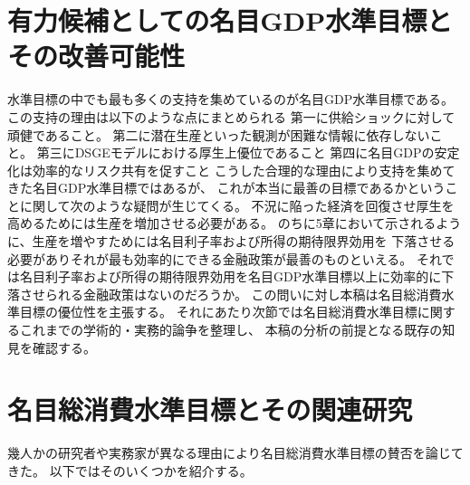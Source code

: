 \section{有力候補としての名目GDP水準目標とその改善可能性}
\label{sec:chapter2_review_merits_of_ngdplt}
水準目標の中でも最も多くの支持を集めているのが名目GDP水準目標である。
この支持の理由は以下のような点にまとめられる
第一に供給ショックに対して頑健であること\parencite{Sumner2014,BhandariFrankel2017}。
第二に潜在生産といった観測が困難な情報に依存しないこと\parencite{Orphanides2003,BeckworthHendrickson2019}。
第三にDSGEモデルにおける厚生上優位であること\parencite{GarinLesterSims2016}
第四に名目GDPの安定化は効率的なリスク共有を促すこと\parencite{Sheedy2014}
こうした合理的な理由により支持を集めてきた名目GDP水準目標ではあるが、
これが本当に最善の目標であるかということに関して次のような疑問が生じてくる。
不況に陥った経済を回復させ厚生を高めるためには生産を増加させる必要がある。
のちに5章において示されるように、生産を増やすためには名目利子率および所得の期待限界効用を
下落させる必要がありそれが最も効率的にできる金融政策が最善のものといえる。
それでは名目利子率および所得の期待限界効用を名目GDP水準目標以上に効率的に下落させられる金融政策はないのだろうか。
この問いに対し本稿は名目総消費水準目標の優位性を主張する。
それにあたり次節では名目総消費水準目標に関するこれまでの学術的・実務的論争を整理し、
本稿の分析の前提となる既存の知見を確認する。

\section{名目総消費水準目標とその関連研究}
\label{sec:chapter2_review_nclt_studies}
幾人かの研究者や実務家が異なる理由により名目総消費水準目標の賛否を論じてきた。
以下ではそのいくつかを紹介する。

